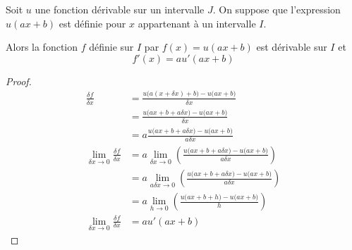 \documentclass[main.tex]{subfiles}
\begin{document}
\begin{proposition}
	Soit $u$ une fonction dérivable sur un intervalle $J$. On suppose que l'expression $u(ax+b)$ est définie pour $x$ appartenant à un intervalle $I$.
	
	Alors la fonction $f$ définie sur $I$ par $f(x)=u(ax+b)$ est dérivable sur $I$ et
	\setlength{\abovedisplayskip}{3pt}
	\setlength{\belowdisplayskip}{3pt} 
	$$f'(x)=au'(ax+b)$$
\end{proposition}
\begin{proof}
	\setlength{\abovedisplayskip}{3pt}
	\setlength{\belowdisplayskip}{3pt}
	\begin{align*}
		\frac{\delta f}{\delta x}&=  \frac{u\big(a(x+\delta x)+b\big)-u\big(ax+b\big)}{\delta x} \\
		& =  \frac{u\big(ax+b + a\delta x \big)-u\big(ax+b\big)}{\delta x} \\
		& =  a \frac{u\big(ax+b + a\delta x \big)-u\big(ax+b\big)}{a\delta x} \\
	\lim_{\delta x\to 0} 	\frac{\delta f}{\delta x}&= 
	a \lim_{\delta x\to 0} \left(\frac{u\big(ax+b + a\delta x \big)-u\big(ax+b\big)}{a\delta x}  \right)\\
&= 
	a \lim_{a\delta x\to 0} \left(\frac{u\big(ax+b + a\delta x \big)-u\big(ax+b\big)}{a\delta x}  \right)\\
&= 
	a \lim_{h\to 0} \left(\frac{u\big(ax+b + h \big)-u\big(ax+b\big)}{h}  \right)\\
	\lim_{\delta x\to 0} 	\frac{\delta f}{\delta x}	&= 
	a u'(ax+b)  
	\end{align*} 
\end{proof}
%	 
\newpage 
{}  
\pagestyle{scrheadings} %
\onehalfspacing
\end{document}
